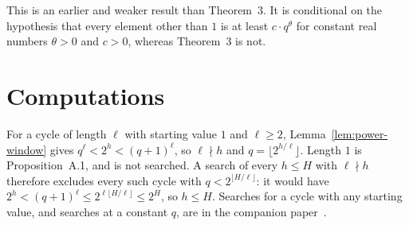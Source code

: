 \documentclass[11pt]{article}
\begin{document}
This is an earlier and weaker result than Theorem~3. It is conditional on the hypothesis that every element other than $1$ is at least $c \cdot q^\theta$ for constant real numbers $\theta > 0$ and $c > 0$, whereas Theorem~3 is not.

\section{Computations}
\label{app:computations}

For a cycle of length $\ell$ with starting value $1$ and $\ell \ge 2$, Lemma~\ref{lem:power-window} gives $q^\ell < 2^h < (q+1)^\ell$, so $\ell \nmid h$ and $q = \lfloor 2^{h/\ell}\rfloor$.
Length $1$ is Proposition~A.1, and is not searched.
A search of every $h \le H$ with $\ell \nmid h$ therefore excludes every such cycle with $q < 2^{\lfloor H/\ell \rfloor}$: it would have $2^h < (q+1)^\ell \le 2^{\ell \lfloor H/\ell \rfloor} \le 2^H$, so $h \le H$.
Searches for a cycle with any starting value, and searches at a constant $q$, are in the companion paper~\cite{hackman-ii}.
\end{document}

